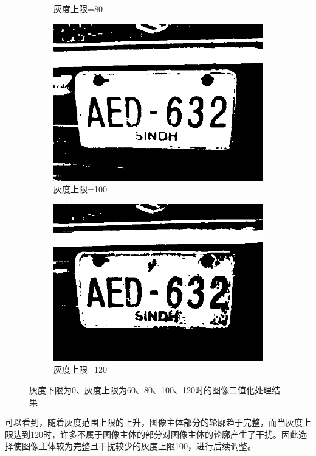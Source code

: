\documentclass[a4paper]{ctexart}
\newcommand{\outwfour}{0.23\textwidth}
\begin{document}
\begin{spacing}{1.35}
\begin{figure}[htbp]
\begin{subfigure}[t]{\outwfour}
			\caption{灰度上限=80}
		\end{subfigure}
		\begin{subfigure}[t]{\outwfour}
			\centering
			\includegraphics[width=\textwidth]{figure/3mask_1_3.png}
			\caption{灰度上限=100}
		\end{subfigure}
		\begin{subfigure}[t]{\outwfour}
			\centering
			\includegraphics[width=\textwidth]{figure/3mask_1_4.png}
			\caption{灰度上限=120}
		\end{subfigure}
		\caption{灰度下限为0、灰度上限为60、80、100、120时的图像二值化处理结果}
		\label{fig:3mask_1}
	\end{figure}
	可以看到，随着灰度范围上限的上升，图像主体部分的轮廓趋于完整，而当灰度上限达到120时，许多不属于图像主体的部分对图像主体的轮廓产生了干扰。因此选择使图像主体较为完整且干扰较少的灰度上限100，进行后续调整。


\end{spacing}
\end{document}

